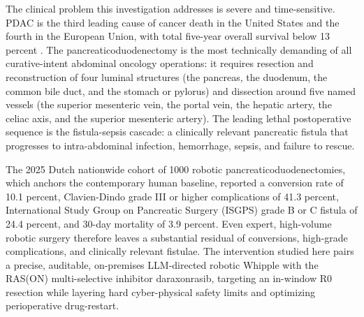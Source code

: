 The clinical problem this investigation addresses is severe and time-sensitive.
PDAC is the third leading cause of cancer death in the United States and the fourth
in the European Union, with total five-year overall survival below 13 percent
\cite{pdac060s2030}. The pancreaticoduodenectomy is the most technically demanding
of all curative-intent abdominal oncology operations: it requires resection and
reconstruction of four luminal structures (the pancreas, the duodenum, the common
bile duct, and the stomach or pylorus) and dissection around five named vessels
(the superior mesenteric vein, the portal vein, the hepatic artery, the celiac
axis, and the superior mesenteric artery). The leading lethal postoperative
sequence is the fistula-sepsis cascade: a clinically relevant pancreatic fistula
that progresses to intra-abdominal infection, hemorrhage, sepsis, and failure to
rescue. 

The 2025 Dutch nationwide cohort of 1000 robotic
pancreaticoduodenectomies, which anchors the contemporary human baseline, reported
a conversion rate of 10.1 percent, Clavien-Dindo grade III or higher complications
of 41.3 percent, International Study Group on Pancreatic Surgery (ISGPS) grade B or
C fistula of 24.4 percent, and 30-day mortality of 3.9 percent. Even expert,
high-volume robotic surgery therefore leaves a substantial residual of conversions,
high-grade complications, and clinically relevant fistulae. The intervention
studied here pairs a precise, auditable, on-premises LLM-directed robotic Whipple
with the RAS(ON) multi-selective inhibitor daraxonrasib, targeting an in-window R0
resection while layering hard cyber-physical safety limits and optimizing
perioperative drug-restart.

\clearpage

